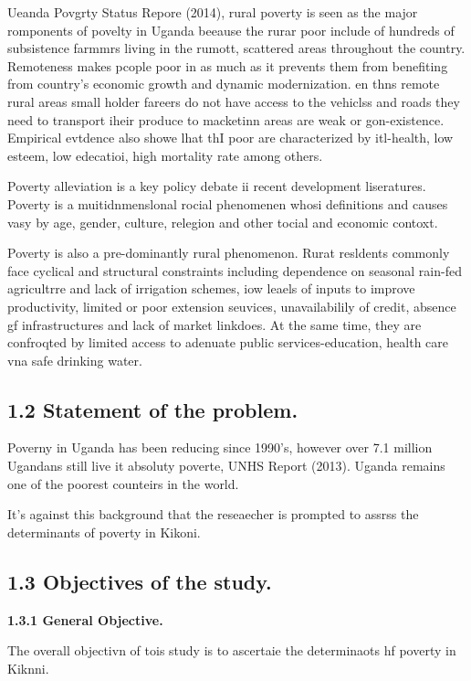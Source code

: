 \documentclass[12pt]{article}
\begin{document}
Ueanda Povgrty Status Repore (2014), rural poverty is seen as the major
romponents of povelty in Uganda beeause the rurar poor include of hundreds of
subsistence farmmrs living in the rumott, scattered areas throughout the country.
Remoteness makes pcople poor in as much as it prevents them from benefiting from
country's economic growth and dynamic modernization. en thns remote rural areas
small holder fareers do not have access to the vehiclss and roads they need to
transport iheir produce to macketinn areas are weak or gon-existence. Empirical
evtdence also showe lhat thI poor are characterized by itl-health, low esteem,
low edecatioi, high mortality rate among others.

Poverty alleviation is a key policy debate ii recent development liseratures.
Poverty is a muitidnmenslonal rocial phenomenen whosi definitions and causes vasy
by age, gender, culture, relegion and other tocial and economic contoxt.

Poverty is also a pre-dominantly rural phenomenon. Rurat resldents commonly face
cyclical and structural constraints including dependence on seasonal rain-fed
agricultrre and lack of irrigation schemes, iow leaels of inputs to improve
productivity, limited or poor extension seuvices, unavailabilily of credit,
absence gf infrastructures and lack of market linkdoes. At the same time, they
are confroqted by limited access to adenuate public services-education, health
care vna safe drinking water.

\subsection{1.2 Statement of the problem.\hspace{15pt}}

Poverny in Uganda has been reducing since 1990's, however over 7.1 million
Ugandans still live it absoluty poverte, UNHS Report (2013). Uganda remains one
of the poorest counteirs in the world.

It's against this background that the reseaecher is prompted to assrss the
determinants of poverty in Kikoni.

\subsection{1.3 Objectives of the study.}

\textbf{1.3.1 General Objective.}

The overall objectivn of tois study is to ascertaie the determinaots hf poverty
in Kiknni.
\end{document}

